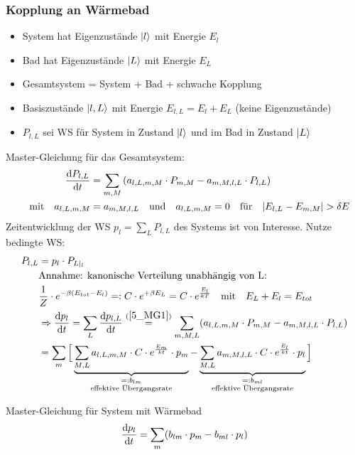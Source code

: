 \subsubsection*{Kopplung an Wärmebad}
\begin{itemize}
    \item System hat Eigenzustände $\ket{l}$ mit Energie $E_l$
    \item Bad hat Eigenzustände $\ket{L}$ mit Energie $E_L$
    \item Gesamtsystem = System + Bad + schwache Kopplung
    \item Basiszustände $\ket{l,L}$ mit Energie $E_{l,L} = E_l + E_L$ (keine Eigenzustände)
    \item $P_{l,L}$ sei WS für System in Zustand $\ket{l}$ und im Bad in Zustand $\ket{L}$    
\end{itemize}
Master-Gleichung für das Gesamtsystem:
\begin{align}\label{5_MG1}
    \dv{P_{l,L}}{t} &= \sum_{m,M} \left(a_{l,L,m,M}\cdot P_{m,M} - a_{m,M,l,L}\cdot P_{l,L} \right) \\
    \qq{mit} a_{l,L,m,M} &= a_{m,M,l,L} \qq{und} a_{l,L,m,M} = 0 \qq{für} \abs{E_{l,L}-E_{m,M}} > \delta E
\end{align}
Zeitentwicklung der WS $p_l = \sum_L P_{l,L}$ des Systems ist von Interesse. Nutze bedingte WS:
\begin{align}
    P_{l,L} &= p_l \cdot P_{L|_l}\\
    &\text{Annahme: kanonische Verteilung unabhängig von L:} \\
    &\frac{1}{Z} \cdot e^{-\beta(E_{tot}-E_l)} =: C\cdot e^{+\beta E_L} = C\cdot e^{\frac{E_l}{kT}} \qq{mit} E_L + E_l = E_{tot} \\
    &\Rightarrow \dv{p_l}{t} = \sum_L \dv{p_{l,L}}{t} \stackrel{(\ref{5_MG1})}{=} \sum_{m,M,L} (a_{l,L,m,M}\cdot P_{m,M}-a_{m,M,l,L}\cdot P_{l,L})\\
    &= \sum_m \Big[ \underbrace{\sum_{M,L} a_{l,L,m,M} \cdot C \cdot e^{\frac{E_m}{kt}}\cdot p_m}_{\substack{=: b_{lm} \\ \text{effektive Übergangsrate}}} - \underbrace{\sum_{M,L} a_{m,M,l,L}\cdot C \cdot e^{\frac{E_l}{kt}} \cdot p_l}_{\substack{=: b_{ml} \\ \text{effektive Übergangsrate}}} \Big]
\end{align}
\begin{definition}{Master-Gleichung für System mit Wärmebad}
\begin{equation}
    \dv{p_l}{t} = \sum_m (b_{lm} \cdot p_m - b_{ml}\cdot p_l)
\end{equation}
\end{definition}
